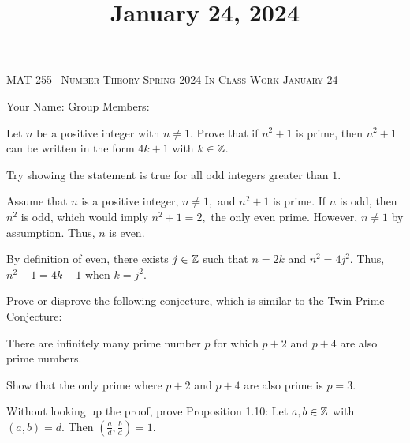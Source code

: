 \documentclass[handout]{ximera}
\title{January 24, 2024}
\begin{document}
\handoutAbstract
\maketitle
    \begin{center}%
        {\large \scshape MAT-255-- Number Theory \hfill Spring 2024 \hfill In Class Work January 24}%
    
        {\large
            Your Name: \hrulefill \quad Group Members:\hrulefill \quad \hrulefill
	    \par}%
    \end{center}%


  
\begin{br}
    Let $n$ be a positive integer with $n\neq 1$. Prove that if $n^2+1$ is prime, then $n^2+1$ can be written in the form $4k+1$ with $k\in\mathbb Z$.


    \begin{hint}
        Try showing the statement is true for all odd integers greater than $1.$
    \end{hint}

    \begin{solution}
        Assume that $n$ is a positive integer, $n\neq 1,$ and $n^2+1$ is prime. If $n$ is odd, then $n^2$ is odd, which would imply $n^2+1=2,$ the only even prime. However, $n\neq 1$ by assumption. Thus, $n$ is even. 

        By definition of even, there exists $j\in\mathbb Z$ such that $n=2k$ and $n^2=4j^2$. Thus, $n^2+1=4k+1$ when $k=j^2.$
    \end{solution}
\end{br}

\pdfOnly{\ifhandout{
    \vfill
    \vfill}
    \else
    \fi}

\begin{br}
    Prove or disprove the following conjecture, which is similar to the Twin Prime Conjecture:
    \begin{conjecture}
        There are infinitely many prime number $p$ for which $p+2$ and $p+4$ are also prime numbers.
    \end{conjecture}


    \begin{hint}
        Show that the only prime where $p+2$ and $p+4$ are also prime is $p=3.$ 
    \end{hint}


    \pdfOnly{\ifhandout{
        \vfill}
        \else
        \fi}
\end{br}

 
\begin{br}
    Without looking up the proof, prove 
    Proposition 1.10:
    Let $a, b\in \mathbb Z$ with $(a,b)=d.$ Then $\left(\frac{a}{d},\frac{b}{d}\right)=1.$
\end{br}
\end{document}
